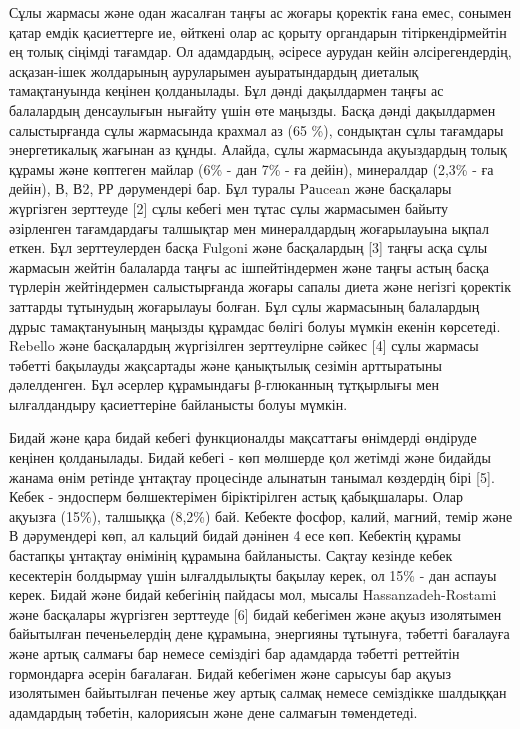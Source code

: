 \begin{multicols}{2}
Сұлы жармасы және одан жасалған таңғы ас жоғары қоректік ғана емес,
сонымен қатар емдік қасиеттерге ие, өйткені олар ас қорыту органдарын
тітіркендірмейтін ең толық сіңімді тағамдар. Ол адамдардың, әсіресе
аурудан кейін әлсірегендердің, асқазан-ішек жолдарының ауруларымен
ауыратындардың диеталық тамақтануында кеңінен қолданылады. Бұл дәнді
дақылдармен таңғы ас балалардың денсаулығын нығайту үшін өте маңызды.
Басқа дәнді дақылдармен салыстырғанда сұлы жармасында крахмал аз (65
\%), сондықтан сұлы тағамдары энергетикалық жағынан аз құнды. Алайда,
сұлы жармасында ақуыздардың толық құрамы және көптеген майлар (6\% - дан
7\% - ға дейін), минералдар (2,3\% - ға дейін), В, В2, РР дәрумендері
бар. Бұл туралы Pаucean және басқалары жүргізген зерттеуде {[}2{]} сұлы
кебегі мен тұтас сұлы жармасымен байыту әзірленген тағамдардағы
талшықтар мен минералдардың жоғарылауына ықпал еткен. Бұл зерттеулерден
басқа Fulgoni және басқалардың {[}3{]} таңғы асқа сұлы жармасын жейтін
балаларда таңғы ас ішпейтіндермен және таңғы астың басқа түрлерін
жейтіндермен салыстырғанда жоғары сапалы диета және негізгі қоректік
заттарды тұтынудың жоғарылауы болған. Бұл сұлы жармасының балалардың
дұрыс тамақтануының маңызды құрамдас бөлігі болуы мүмкін екенін
көрсетеді. Rebello және басқалардың жүргізілген зерттеулірне сәйкес
{[}4{]} сұлы жармасы тәбетті бақылауды жақсартады және қанықтылық
сезімін арттыратыны дәлелденген. Бұл әсерлер құрамындағы β-глюканның
тұтқырлығы мен ылғалдандыру қасиеттеріне байланысты болуы мүмкін.

Бидай және қара бидай кебегі функционалды мақсаттағы өнімдерді өндіруде
кеңінен қолданылады. Бидай кебегі - көп мөлшерде қол жетімді және
бидайды жанама өнім ретінде ұнтақтау процесінде алынатын танымал
көздердің бірі {[}5{]}. Кебек - эндосперм бөлшектерімен біріктірілген
астық қабықшалары. Олар ақуызға (15\%), талшыққа (8,2\%) бай. Кебекте
фосфор, калий, магний, темір және В дәрумендері көп, ал кальций бидай
дәнінен 4 есе көп. Кебектің құрамы бастапқы ұнтақтау өнімінің құрамына
байланысты. Сақтау кезінде кебек кесектерін болдырмау үшін ылғалдылықты
бақылау керек, ол 15\% - дан аспауы керек. Бидай және бидай кебегінің
пайдасы мол, мысалы Hassanzadeh-Rostami және басқалары жүргізген
зерттеуде {[}6{]} бидай кебегімен және ақуыз изолятымен байытылған
печеньелердің дене құрамына, энергияны тұтынуға, тәбетті бағалауға және
артық салмағы бар немесе семіздігі бар адамдарда тәбетті реттейтін
гормондарға әсерін бағалаған. Бидай кебегімен және сарысуы бар ақуыз
изолятымен байытылған печенье жеу артық салмақ немесе семіздікке
шалдыққан адамдардың тәбетін, калориясын және дене салмағын төмендетеді.


\end{multicols}
